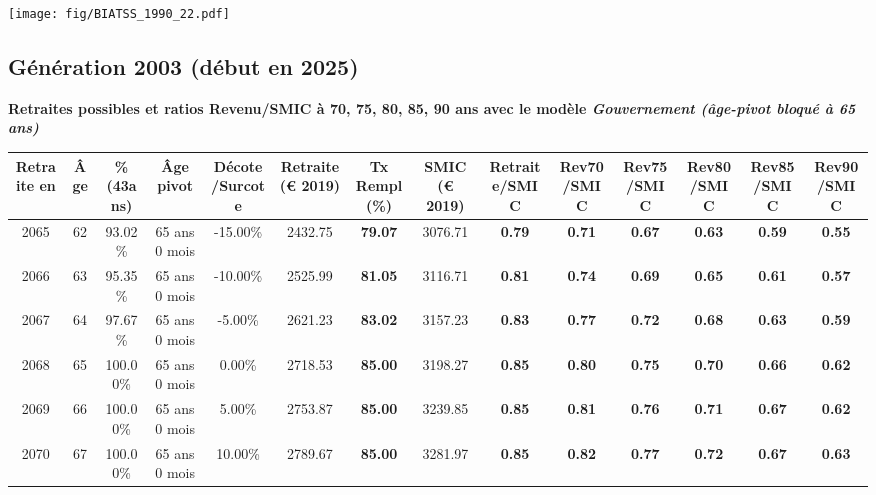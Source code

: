  \vspace{0.1cm} 

 \begin{center}\texttt{[image: fig/BIATSS\_1990\_22.pdf]}\end{center} \label{fig/BIATSS_1990_22.pdf} 

\newpage 
 
\subsection{Génération 2003 (début en 2025)} 

{\bf \noindent Retraites possibles et ratios Revenu/SMIC à 70, 75, 80, 85, 90 ans avec le modèle \emph{Gouvernement (âge-pivot bloqué à 65 ans)}}  
 
\begin{adjustbox}{max width=\textwidth} 
\begin{tabular}[htb]{|c|c||c|c|c||c|c||c||c|c|c|c|c|c|} 
\hline 
 Retraite en &  Âge &  \%(43ans) &  Âge pivot &  Décote/Surcote &  Retraite (\euro{} 2019) &  Tx Rempl(\%) &  SMIC (\euro{} 2019) &  Retraite/SMIC &  Rev70/SMIC &  Rev75/SMIC &  Rev80/SMIC &  Rev85/SMIC &  Rev90/SMIC \\ 
\hline \hline 
 2065 &  62 &  93.02\% &  65 ans 0 mois &  -15.00\% &  2432.75 &  {\bf 79.07} &  3076.71 &  {\bf {\color{red} 0.79}} &  {\bf {\color{red} 0.71}} &  {\bf {\color{red} 0.67}} &  {\bf {\color{red} 0.63}} &  {\bf {\color{red} 0.59}} &  {\bf {\color{red} 0.55}} \\ 
\hline 
 2066 &  63 &  95.35\% &  65 ans 0 mois &  -10.00\% &  2525.99 &  {\bf 81.05} &  3116.71 &  {\bf {\color{red} 0.81}} &  {\bf {\color{red} 0.74}} &  {\bf {\color{red} 0.69}} &  {\bf {\color{red} 0.65}} &  {\bf {\color{red} 0.61}} &  {\bf {\color{red} 0.57}} \\ 
\hline 
 2067 &  64 &  97.67\% &  65 ans 0 mois &  -5.00\% &  2621.23 &  {\bf 83.02} &  3157.23 &  {\bf {\color{red} 0.83}} &  {\bf {\color{red} 0.77}} &  {\bf {\color{red} 0.72}} &  {\bf {\color{red} 0.68}} &  {\bf {\color{red} 0.63}} &  {\bf {\color{red} 0.59}} \\ 
\hline 
 2068 &  65 &  100.00\% &  65 ans 0 mois &  0.00\% &  2718.53 &  {\bf 85.00} &  3198.27 &  {\bf {\color{red} 0.85}} &  {\bf {\color{red} 0.80}} &  {\bf {\color{red} 0.75}} &  {\bf {\color{red} 0.70}} &  {\bf {\color{red} 0.66}} &  {\bf {\color{red} 0.62}} \\ 
\hline 
 2069 &  66 &  100.00\% &  65 ans 0 mois &  5.00\% &  2753.87 &  {\bf 85.00} &  3239.85 &  {\bf {\color{red} 0.85}} &  {\bf {\color{red} 0.81}} &  {\bf {\color{red} 0.76}} &  {\bf {\color{red} 0.71}} &  {\bf {\color{red} 0.67}} &  {\bf {\color{red} 0.62}} \\ 
\hline 
 2070 &  67 &  100.00\% &  65 ans 0 mois &  10.00\% &  2789.67 &  {\bf 85.00} &  3281.97 &  {\bf {\color{red} 0.85}} &  {\bf {\color{red} 0.82}} &  {\bf {\color{red} 0.77}} &  {\bf {\color{red} 0.72}} &  {\bf {\color{red} 0.67}} &  {\bf {\color{red} 0.63}} \\ 
\hline 
\hline 
\end{tabular} 
\end{adjustbox} 
 
